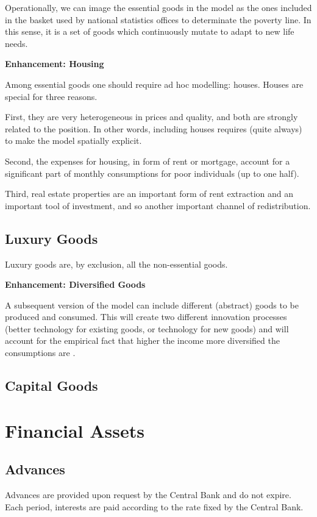 \documentclass[a4paper, headings=standardclasses]{scrartcl}
\newenvironment{enh}[1][]{\begin{framed}\noindent\textbf{Enhancement: #1}\par}{\end{framed}}
\begin{document}
Operationally, we can image the essential goods in the model as the ones included in the basket used by national statistics offices to determinate the poverty line. In this sense, it is a set of goods which continuously mutate to adapt to new life needs.

\begin{enh}[Housing]
	Among essential goods one should require ad hoc modelling: houses. Houses are special for three reasons.
	
	First, they are very heterogeneous in prices and quality, and both are strongly related to the position. In other words, including houses requires (quite always) to make the model spatially explicit.
	
	Second, the expenses for housing, in form of rent or mortgage, account for a significant part of monthly consumptions for poor individuals (up to one half).
	
	Third, real estate properties are an important form of rent extraction and an important tool of investment, and so another important channel of redistribution.
\end{enh}

\subsection{Luxury Goods}
Luxury goods are, by exclusion, all the non-essential goods.

\begin{enh}[Diversified Goods]
	A subsequent version of the model can include different (abstract) goods to be produced and consumed. This will  create two different innovation processes (better technology for existing goods, or technology for new goods) and will account for the empirical fact that higher the income more diversified the consumptions are \parencite[cfr.][§2]{didomenico2022}.
\end{enh}

\subsection{Capital Goods}

\section{Financial Assets}

\subsection{Advances}
Advances are provided upon request by the Central Bank and do not expire. Each period, interests are paid according to the rate fixed by the Central Bank.
\end{document}
